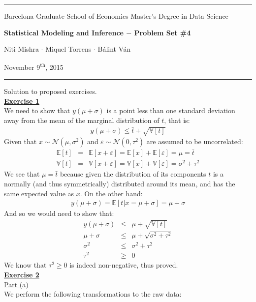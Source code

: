 \documentclass[a4paper, 11pt]{article}
\newcommand{\header}[4]{
	\begin{center}
		\rule{\linewidth}{0.5pt}
		
		{\small{#1}}
      
        \vspace{0.2in}
        
		{\large{#2}}
		
        \vspace{0.2in}
        
		{\small{#3}}
		
		\vspace{0.15in}
		
		{#4}
		
		\vspace{-0.1in}
		\rule{\linewidth}{0.6pt}
	\end{center}
}
\begin{document}
 
\header{\sc Barcelona Graduate School of Economics \hfill Master's Degree in Data Science}{\bf Statistical Modeling and Inference $-$ Problem Set \#4}{\sc Niti Mishra $\cdot$ Miquel Torrens $\cdot$ B\'alint V\'an}{November 9\textsuperscript{th}, 2015}
Solution to proposed exercises.\\
\newline \textbf{\underline{Exercise 1}}\\
\newline We need to show that $y(\mu + \sigma)$ is a point less than one standard deviation away from the mean of the marginal distribution of $t$, that is:
\begin{eqnarray}
y(\mu + \sigma) \leq \bar{t} + \sqrt{\mathbb{V}[t]} \nonumber
\end{eqnarray}
Given that $x \sim \mathcal{N}(\mu, \sigma^2)$ and $\varepsilon \sim \mathcal{N}(0, \tau^2)$ are assumed to be uncorrelated:
\begin{eqnarray}
\mathbb{E}[t] &=& \mathbb{E}[x + \varepsilon] = \mathbb{E}[x] + \mathbb{E}[\varepsilon] = \mu = \bar{t} \nonumber \\
\mathbb{V}[t] &=& \mathbb{V}[x + \varepsilon] = \mathbb{V}[x] + \mathbb{V}[\varepsilon] = \sigma^2 + \tau^2 \nonumber
\end{eqnarray}
We see that $\mu = \bar{t}$ because given the distribution of its components $t$ is a normally (and thus symmetrically) distributed around its mean, and has the same expected value as $x$. On the other hand:
\begin{eqnarray}
y(\mu + \sigma) = \mathbb{E}[t | x = \mu + \sigma] = \mu + \sigma \nonumber
\end{eqnarray}
And so we would need to show that:
\begin{eqnarray}
y(\mu + \sigma) &\leq& \mu + \sqrt{\mathbb{V}[t]} \nonumber \\
\mu + \sigma &\leq& \mu + \sqrt{\sigma^2 + \tau^2} \nonumber \\
\sigma^2 &\leq& \sigma^2 + \tau^2  \nonumber \\
\tau^2 &\geq& 0 \nonumber
\end{eqnarray}
We know that $\tau^2 \geq 0$ is indeed non-negative, thus proved.\\
\newpage
\textbf{\underline{Exercise 2}}\\
\newline \underline{Part (a)}\\
\newline We perform the following transformations to the raw data:
\end{document}
